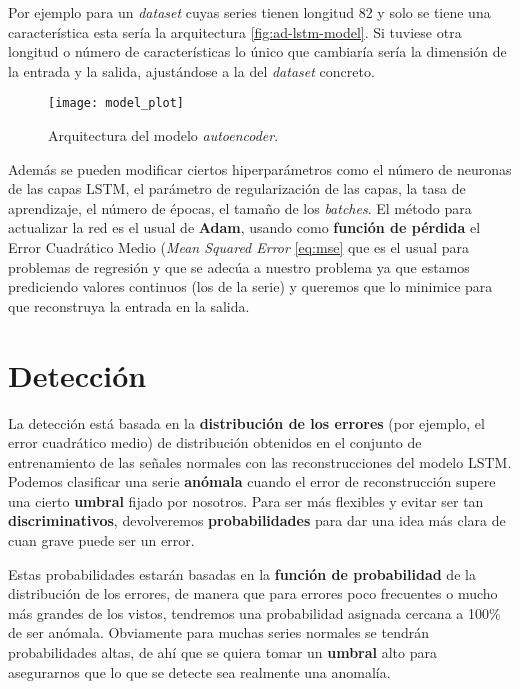 Por ejemplo para un \emph{dataset} cuyas series tienen longitud 82 y solo se tiene una característica esta sería la arquitectura \autoref{fig:ad-lstm-model}. Si tuviese otra longitud o número de características lo único que cambiaría sería la dimensión de la entrada y la salida, ajustándose a la del \emph{dataset} concreto.

\begin{figure}[htpb]
  \centering
  \texttt{[image: model\_plot]}
  \caption{Arquitectura del modelo \emph{autoencoder}.}
  \label{fig:ad-lstm-model}
\end{figure}

Además se pueden modificar ciertos hiperparámetros como el número de neuronas de las capas LSTM, el parámetro de regularización de las capas, la tasa de aprendizaje, el número de épocas, el tamaño de los \emph{batches}. El método para actualizar la red es el usual de \textbf{Adam}, usando como \textbf{función de pérdida} el Error Cuadrático Medio (\emph{Mean Squared Error} \eqref{eq:mse} que es el usual para problemas de regresión y que se adecúa a nuestro problema ya que estamos prediciendo valores continuos (los de la serie) y queremos que lo minimice para que reconstruya la entrada en la salida.

\section{Detección}

La detección está basada en la \textbf{distribución de los errores} (por ejemplo, el error cuadrático medio) de distribución obtenidos en el conjunto de entrenamiento de las señales normales con las reconstrucciones del modelo LSTM. Podemos clasificar una serie \textbf{anómala} cuando el error de reconstrucción supere una cierto \textbf{umbral} fijado por nosotros. Para ser más flexibles y evitar ser tan \textbf{discriminativos}, devolveremos \textbf{probabilidades} para dar una idea más clara de cuan grave puede ser un error.

Estas probabilidades estarán basadas en la \textbf{función de probabilidad} de la distribución de los errores, de manera que para errores poco frecuentes o mucho más grandes de los vistos, tendremos una probabilidad asignada cercana a 100\% de ser anómala. Obviamente para muchas series normales se tendrán probabilidades altas, de ahí que se quiera tomar un \textbf{umbral} alto para asegurarnos que lo que se detecte sea realmente una anomalía.


